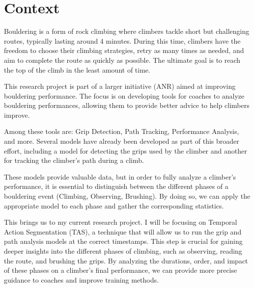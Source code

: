 \section{Context}
\label{section:context}

Bouldering is a form of rock climbing where climbers tackle short but challenging routes, typically lasting around 4 minutes. During this time, climbers have the freedom to choose their climbing strategies, retry as many times as needed, and aim to complete the route as quickly as possible. The ultimate goal is to reach the top of the climb in the least amount of time.

This research project is part of a larger initiative (ANR) aimed at improving bouldering performance. The focus is on developing tools for coaches to analyze bouldering performances, allowing them to provide better advice to help climbers improve.

Among these tools are: Grip Detection, Path Tracking, Performance Analysis, and more. Several models have already been developed as part of this broader effort, including a model for detecting the grips used by the climber and another for tracking the climber's path during a climb.

These models provide valuable data, but in order to fully analyze a climber's performance, it is essential to distinguish between the different phases of a bouldering event (Climbing, Observing, Brushing). By doing so, we can apply the appropriate model to each phase and gather the corresponding statistics.

This brings us to my current research project. I will be focusing on Temporal Action Segmentation (TAS), a technique that will allow us to run the grip and path analysis models at the correct timestamps. This step is crucial for gaining deeper insights into the different phases of climbing, such as observing, reading the route, and brushing the grips. By analyzing the durations, order, and impact of these phases on a climber's final performance, we can provide more precise guidance to coaches and improve training methods.

